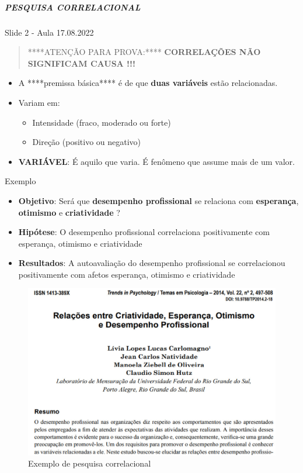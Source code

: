 \documentclass[
]{book}
\providecommand{\tightlist}{%
  \setlength{\itemsep}{0pt}\setlength{\parskip}{0pt}}
\begin{document}
\hypertarget{pesquisa-correlacional}{%
\subparagraph{PESQUISA CORRELACIONAL}\label{pesquisa-correlacional}}

Slide 2 - Aula 17.08.2022

\begin{quote}
****ATENÇÃO PARA PROVA:**** \textbf{CORRELAÇÕES NÃO SIGNIFICAM CAUSA !!!}
\end{quote}

\begin{itemize}
\tightlist
\item
  A ****premissa básica**** é de que \textbf{duas variáveis} estão relacionadas.
\item
  Variam em:

  \begin{itemize}
  \tightlist
  \item
    Intensidade (fraco, moderado ou forte)
  \item
    Direção (positivo ou negativo)
  \end{itemize}
\item
  \textbf{VARIÁVEL}: É aquilo que varia. É fenômeno que assume mais de um valor.
\end{itemize}

Exemplo

\begin{itemize}
\tightlist
\item
  \textbf{Objetivo}: Será que \textbf{desempenho profissional} se relaciona com \textbf{esperança}, \textbf{otimismo} e \textbf{criatividade} ?
\item
  \textbf{Hipótese}: O desempenho profissional correlaciona positivamente com esperança, otimismo e criatividade
\item
  \textbf{Resultados}: A autoavaliação do desempenho profissional se correlacionou positivamente com afetos esperança, otimismo e criatividade
\end{itemize}

\begin{figure}

{\centering \includegraphics[width=0.8\linewidth]{imagens/exemplo-pesquisa-correlacional} 

}

\caption{Exemplo de pesquisa correlacional}\label{fig:unnamed-chunk-15}
\end{figure}
\end{document}
